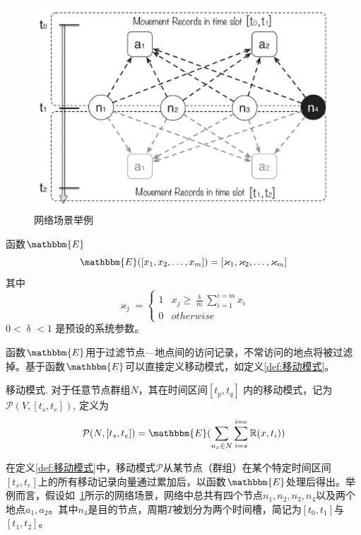 \begin{figure}[t]
\centering
  \includegraphics[width=0.7\linewidth]{paper-MPAR/example1}
  \caption{网络场景举例}
  \label{fig:chap3_example1}
\end{figure}

\begin{definition} 函数$\mathbbm{E}$
\[\mathbbm{E}([x_1,x_2,\ldots,x_m])=[\varkappa _1,\varkappa _2,\ldots,\varkappa _m]\]\textnormal{其中}
\begin{equation}
\varkappa _j=\left\{
\begin{array}{cl}
 1 &x_j\geq\frac{\updelta}{m}\sum_{i=1}^{i=m}x_i\\
 0 & otherwise
\end{array}
\right.
\label{eq:extract}
\end{equation}
\textnormal{$0<\updelta<1$ 是预设的系统参数。}
\label{def:函数E}
\end{definition}

函数$\mathbbm{E}$用于过滤节点—地点间的访问记录，不常访问的地点将被过滤掉。基于函数$\mathbbm{E}$可以直接定义移动模式，如定义\ref{def:移动模式}。

\begin{definition} 移动模式.
对于任意节点群组$N$，其在时间区间$[t_p,t_q]$ 内的移动模式，记为$\mathcal{P}(V,[t_s,t_e])$, 定义为
\begin{equation}
\mathcal{P}(N,[t_s,t_e])= \mathbbm{E}(\sum_{n_x \in N}\sum_{i=s}^{i=e}\mathbb{R}(x,t_i))
\label{eq:pattern}
\end{equation}
\label{def:移动模式}
\end{definition}

在定义\ref{def:移动模式}中，移动模式$\mathcal{P}$从某节点（群组）在某个特定时间区间$[t_s,t_e]$上的所有移动记录向量通过累加后，以函数$\mathbbm{E}$处理后得出。举例而言，假设如\figurename~\ref{fig:chap3_example1}所示的网络场景，网络中总共有四个节点$n_1,n_2,n_3,n_4$以及两个地点$a_1,a_2$。其中$n_4$是目的节点，周期$T$被划分为两个时间槽，简记为$[t_0,t_1]$与$[t_1,t_2]$。



